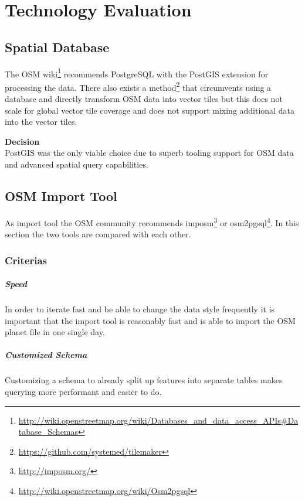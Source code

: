 \chapter{Technology Evaluation}\label{technology_evaluation}

\section{Spatial Database}\label{spatial_database}

The OSM wiki\footnote{\url{http://wiki.openstreetmap.org/wiki/Databases_and_data_access_APIs\#Database_Schemas}} recommends PostgreSQL with the PostGIS extension for processing the data. There also exists a method\footnote{\url{https://github.com/systemed/tilemaker}} that circumvents using a database and directly transform OSM data into vector tiles but this does not scale for global vector tile coverage and does not support mixing additional data into the vector tiles.

\begin{tcolorbox}
\textbf{Decision} \\
PostGIS was the only viable choice due to superb tooling support for OSM data and
advanced spatial query capabilities.
\end{tcolorbox}

\section{OSM Import Tool}\label{osm_import_tool}
As import tool the OSM community recommends imposm\footnote{\url{http://imposm.org/}} or osm2pgsql\footnote{\url{http://wiki.openstreetmap.org/wiki/Osm2pgsql}}.
In this section the two tools are compared with each other.

\subsection{Criterias}\label{criterias}

\paragraph{Speed} 
In order to iterate fast and be able to change the data style frequently
it is important that the import tool is reasonably fast and is able
to import the OSM planet file in one single day.

\paragraph{Customized Schema}
Customizing a schema to already split up features into separate tables
makes querying more performant and easier to do.

